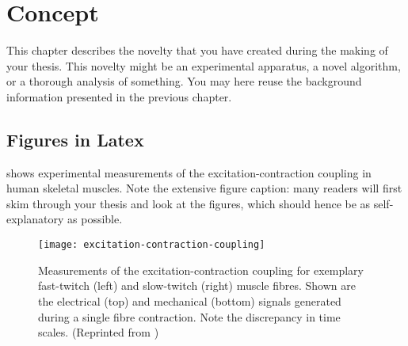 \chapter{Concept}
\label{chap:concept}

This chapter describes the novelty that you have created during the making of your thesis.
This novelty might be an experimental apparatus, a novel algorithm, or a thorough analysis of something.
You may here reuse the background information presented in the previous chapter.

\section{Figures in Latex}
 shows experimental measurements of the excitation-contraction coupling in human skeletal muscles.
Note the extensive figure caption: many readers will first skim through your thesis and look at the figures, which should hence be as self-explanatory as possible.
\begin{figure}
  \centering
  \texttt{[image: excitation-contraction-coupling]}
  \caption[Measurements of the excitation-contraction coupling for exemplary fast-twitch and slow-twitch muscle fibres]{Measurements of the excitation-contraction coupling for exemplary fast-twitch (left) and slow-twitch (right) muscle fibres. Shown are the electrical (top) and mechanical (bottom) signals generated during a single fibre contraction. Note the discrepancy in time scales. (Reprinted from \cite{merletti04})}
  \label{fig:excitation-contraction-coupling}
\end{figure}

